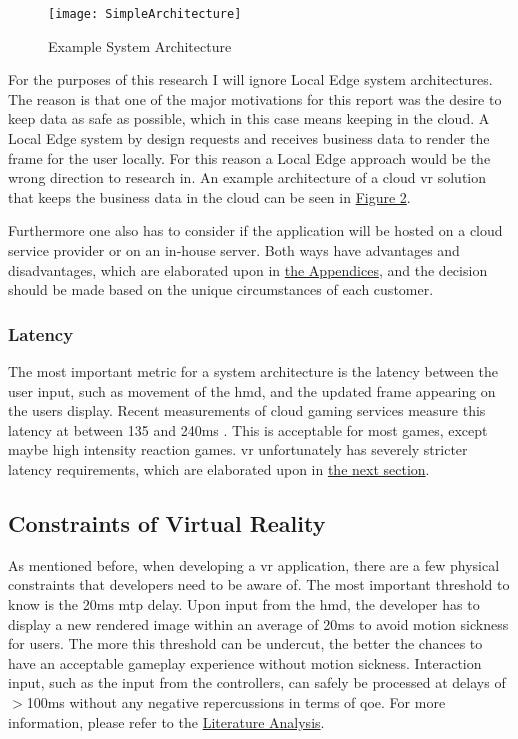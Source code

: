 \begin{figure}[!htbp]
\caption{Example System Architecture}
\label{fig:sysarch}
\texttt{[image: SimpleArchitecture]}
\end{figure}

For the purposes of this research I will ignore Local Edge system architectures. The reason is that one of the major motivations for this report was the desire to keep data as safe as possible, which in this case means keeping in the cloud. A Local Edge system by design requests and receives business data to render the frame for the user locally. For this reason a Local Edge approach would be the wrong direction to research in. An example architecture of a cloud \acrshort{vr} solution that keeps the business data in the cloud can be seen in \hyperref[fig:sysarch]{Figure 2}.

Furthermore one also has to consider if the application will be hosted on a cloud service provider or on an in-house server. Both ways have advantages and disadvantages, which are elaborated upon in \hyperref[app:swot]{the Appendices}, and the decision should be made based on the unique circumstances of each customer.

\subsubsection{Latency}
The most important metric for a system architecture is the latency between the user input, such as movement of the \acrshort{hmd}, and the updated frame appearing on the users display. Recent measurements of cloud gaming services measure this latency at between 135 and 240\acrshort{ms} \parencite{lagmeasure}. This is acceptable for most games, except maybe high intensity reaction games. \acrshort{vr} unfortunately has severely stricter latency requirements, which are elaborated upon in \hyperref[ssec:vrphy]{the next section}.

\subsection{Constraints of Virtual Reality}
\label{ssec:vrphy}
As mentioned before, when developing a \acrshort{vr} application, there are a few physical constraints that developers need to be aware of. The most important threshold to know is the 20\acrshort{ms} \acrshort{mtp} delay. Upon input from the \acrshort{hmd}, the developer has to display a new rendered image within an average of 20\acrshort{ms} to avoid motion sickness for users. The more this threshold can be undercut, the better the chances to have an acceptable gameplay experience without motion sickness. Interaction input, such as the input from the controllers, can safely be processed at delays of $>$100\acrshort{ms} without any negative repercussions in terms of \acrfull{qoe}. For more information, please refer to the \hyperref[sec:lit]{Literature Analysis}.

